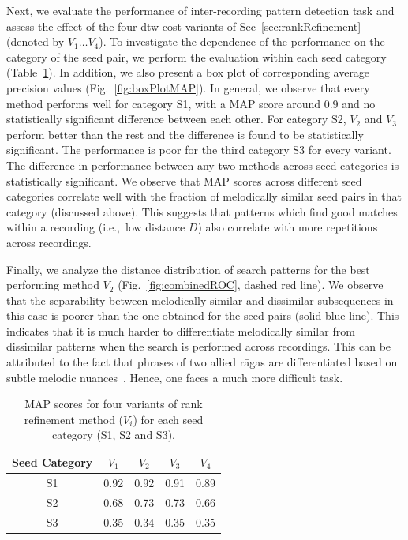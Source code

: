 
Next, we evaluate the performance of inter-recording pattern detection task and assess the effect of the four \gls{dtw} cost variants of Sec~\ref{sec:rankRefinement} (denoted by $V_1 \dots V_4$). To investigate the dependence of  the performance on the category of the seed pair, we perform the evaluation within each seed category (Table~\ref{tab:meanAveragePrecision}). In addition, we also present a box plot of corresponding average precision values (Fig.~\ref{fig:boxPlotMAP}). In general, we observe that every method performs well for category S1, with a MAP score around 0.9 and no statistically significant difference between each other. For category S2, $V_2$ and $V_3$ perform better than the rest and the difference is found to be statistically significant. The performance is poor for the third category S3 for every variant. The difference in performance between any two methods across seed categories is statistically significant. We observe that MAP scores across different seed categories correlate well with the fraction of melodically similar seed pairs in that category (discussed above). This suggests that patterns which find good matches within a recording (i.e.,~low distance $D$) also correlate with more repetitions across recordings.

Finally, we analyze the distance distribution of search patterns for the best performing method $V_2$ (Fig.~\ref{fig:combinedROC}, dashed red line). We observe that the separability between melodically similar and dissimilar subsequences in this case is poorer than the one obtained for the seed pairs (solid blue line). This indicates that it is much harder to differentiate melodically similar from dissimilar patterns when the search is performed across recordings. This can be attributed to the fact that phrases of two allied r\={a}gas are differentiated based on subtle melodic nuances~\cite{Viswanathan2004}. Hence, one faces a much more difficult task. 

\begin{table} 
	\centering
	\caption{MAP scores for four variants of rank refinement method ($V_i$) for each seed category (S1, S2 and S3).}
	\label{tab:meanAveragePrecision}
	
	\begin{tabular}{ c | c c c c}
		\hline\hline
		Seed Category   & $V_1$		&	$V_2$ & $V_3$	 &	$V_4$ 	\\	
		\hline
		S1 & 0.92    &	0.92		&	0.91    &	0.89\\
		S2 & 0.68    &	0.73		&	0.73    &	0.66\\
		S3 & 0.35    &	0.34    &	0.35    &	0.35\\
		\hline\hline
	\end{tabular}
	
\end{table}

